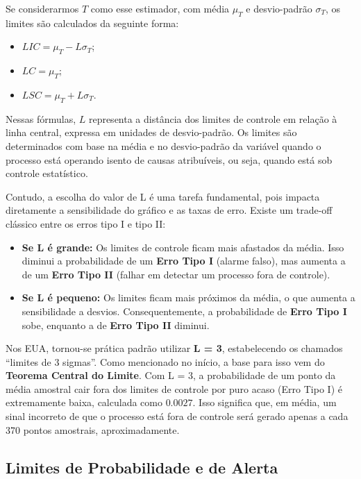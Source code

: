 \documentclass[
  portuguese,
  11pt,
  a4paper,
  DIV=11,
  numbers=noendperiod]{scrreprt}
\providecommand{\tightlist}{%
  \setlength{\itemsep}{0pt}\setlength{\parskip}{0pt}}
\begin{document}
Se considerarmos \(T\) como esse estimador, com média \(\mu_T\) e
desvio-padrão \(\sigma_T\), os limites são calculados da seguinte forma:

\begin{itemize}
\tightlist
\item
  \(LIC = \mu_T - L\sigma_T\);
\item
  \(LC = \mu_T\);
\item
  \(LSC = \mu_T + L\sigma_T\).
\end{itemize}

Nessas fórmulas, \textbf{\(L\)} representa a distância dos limites de
controle em relação à linha central, expressa em unidades de
desvio-padrão. Os limites são determinados com base na média e no
desvio-padrão da variável quando o processo está operando isento de
causas atribuíveis, ou seja, quando está sob controle estatístico.

Contudo, a escolha do valor de L é uma tarefa fundamental, pois impacta
diretamente a sensibilidade do gráfico e as taxas de erro. Existe um
trade-off clássico entre os erros tipo I e tipo II:

\begin{itemize}
\tightlist
\item
  \textbf{Se L é grande:} Os limites de controle ficam mais afastados da
  média. Isso diminui a probabilidade de um \textbf{Erro Tipo I} (alarme
  falso), mas aumenta a de um \textbf{Erro Tipo II} (falhar em detectar
  um processo fora de controle).
\item
  \textbf{Se L é pequeno:} Os limites ficam mais próximos da média, o
  que aumenta a sensibilidade a desvios. Consequentemente, a
  probabilidade de \textbf{Erro Tipo I} sobe, enquanto a de \textbf{Erro
  Tipo II} diminui.
\end{itemize}

Nos EUA, tornou-se prática padrão utilizar \textbf{L = 3}, estabelecendo
os chamados ``limites de 3 sigmas''. Como mencionado no início, a base
para isso vem do \textbf{Teorema Central do Limite}. Com L = 3, a
probabilidade de um ponto da média amostral cair fora dos limites de
controle por puro acaso (Erro Tipo I) é extremamente baixa, calculada
como \(0.0027\). Isso significa que, em média, um sinal incorreto de que
o processo está fora de controle será gerado apenas a cada 370 pontos
amostrais, aproximadamente.

\subsection{Limites de Probabilidade e de
Alerta}\label{limites-de-probabilidade-e-de-alerta}
\end{document}
